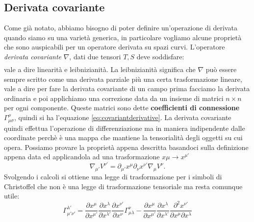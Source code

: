 \documentclass[twoside]{article}
\begin{document}
\subsection{Derivata covariante}
Come già notato, abbiamo bisogno di poter definire un'operazione di derivata quando siamo su una varietà generica, in particolare vogliamo alcune proprietà che sono auspicabili per un operatore derivata su spazi curvi. L'operatore \emph{derivata covariante} $\nabla$, dati due tensori $T,S$ deve soddisfare:
\begin{align}
\end{align}
vale a dire linearità e leibnizianità. La leibnizianità significa che $\nabla$ può essere sempre scritto come una derivata parziale più una certa trasformazione lineare, vale a dire per fare la derivata covariante di un campo prima facciamo la derivata ordinaria e poi applichiamo una correzione data da un insieme di matrici $n\times n$ per ogni componente. Queste matrici sono dette \textbf{coefficienti di connessione} $\Gamma^{\rho}_{\mu \sigma}$, quindi si ha l'equazione \ref{eq:covariantderivative}.
La derivata covariante quindi effettua l'operazione di differenziazione ma in maniera indipendente dalle coordinate perchè è una mappa che mantiene la tensorialità degli oggetti su cui opera. Possiamo provare la proprietà appena descritta basandoci sulla definizione appena data ed applicandola ad una trasformazione $x\mu \rightarrow x^{\mu'}$
\begin{equation}
	\nabla_{\mu'}V^{\nu'} = \partial_{\mu'} x^\mu \partial_{\nu}x^{\nu'} \nabla_{\mu}V^{\nu}.
\end{equation}
Svolgendo i calcoli si ottiene una legge di trasformazione per i simboli di Christoffel che non è una legge di trasformazione tensoriale ma resta comunque utile:
\begin{equation}
\Gamma^{\lambda'}_{\mu'\nu'} = 
\frac{\partial x^{\mu}}{\partial x^{\mu'}} \frac{\partial x^\lambda}{\partial x^{\lambda'}} \frac{\partial x^{\nu'}}{\partial x^\nu} \Gamma^{\nu}_{\mu \lambda} - 
\frac{\partial x^{\mu}}{\partial x^{\mu'}} \frac{\partial x^\lambda}{\partial x^{\lambda'}} \frac{\partial^2 x^{\nu'}}{\partial x^{\mu}\partial x^{\lambda}}
\end{equation}
\end{document}
